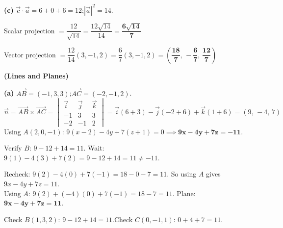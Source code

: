 \documentclass[addpoints]{exam}
\begin{document}
\begin{questions}
\begin{solution}[10cm]
\textbf{(c)} $\vec{c}\cdot\vec{a} = 6+0+6=12$;\quad $|\vec{a}|^2=14$.

Scalar projection $= \dfrac{12}{\sqrt{14}} = \dfrac{12\sqrt{14}}{14} = \mathbf{\dfrac{6\sqrt{14}}{7}}$

Vector projection $= \dfrac{12}{14}(3,-1,2) = \dfrac{6}{7}(3,-1,2)
= \mathbf{\left(\dfrac{18}{7},\,-\dfrac{6}{7},\,\dfrac{12}{7}\right)}$
\end{solution}

\question \textbf{(Lines and Planes)}
\begin{solution}[10cm]
\textbf{(a)} $\overrightarrow{AB} = (-1,3,3)$;\quad $\overrightarrow{AC} = (-2,-1,2)$.
\[
\vec{n} = \overrightarrow{AB}\times\overrightarrow{AC} =
\begin{vmatrix}\vec{i}&\vec{j}&\vec{k}\\-1&3&3\\-2&-1&2\end{vmatrix}
= \vec{i}(6+3)-\vec{j}(-2+6)+\vec{k}(1+6) = (9,\,-4,\,7)
\]
Using $A(2,0,-1)$:
$9(x-2)-4y+7(z+1)=0 \implies \mathbf{9x-4y+7z=-11}$.

Verify $B$: $9-12+14=11$. Wait: $9(1)-4(3)+7(2)=9-12+14=11\neq -11$.

Recheck: $9(2)-4(0)+7(-1)=18-0-7=11$. So using $A$ gives $9x-4y+7z=11$. \\
Using $A$: $9(2)+(-4)(0)+7(-1)=18-7=11$. Plane: $\mathbf{9x-4y+7z=11}$.

Check $B(1,3,2)$: $9-12+14=11$\checkmark.\quad Check $C(0,-1,1)$: $0+4+7=11$\checkmark.


\end{solution}
\end{questions}
\end{document}
